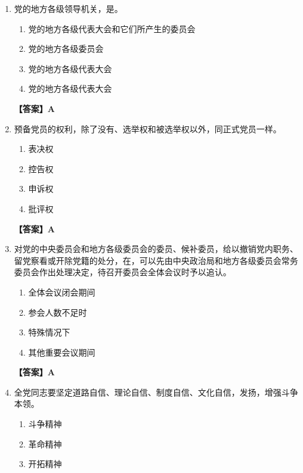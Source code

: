 \documentclass[UTF8,11pt,a4paper]{ctexart}
\begin{document}
\begin{enumerate}[label=\textbf{\arabic*.}, leftmargin=2.5em, itemsep=0.7em]
\begin{enumerate}[label=\Alph*., leftmargin=2em, itemsep=0.1em, topsep=0.15em]
\item 诚信友善
\item 守正务实
\end{enumerate}
\textbf{【答案】A}
\item 党的地方各级领导机关，是\allowbreak\underline{\hspace{4em}}。
\begin{enumerate}[label=\Alph*., leftmargin=2em, itemsep=0.1em, topsep=0.15em]
\item 党的地方各级代表大会和它们所产生的委员会
\item 党的地方各级委员会
\item 党的地方各级代表大会
\item 党的地方各级代表大会
\end{enumerate}
\textbf{【答案】A}
\item 预备党员的权利，除了没有\allowbreak\underline{\hspace{4em}}、选举权和被选举权以外，同正式党员一样。
\begin{enumerate}[label=\Alph*., leftmargin=2em, itemsep=0.1em, topsep=0.15em]
\item 表决权
\item 控告权
\item 申诉权
\item 批评权
\end{enumerate}
\textbf{【答案】A}
\item 对党的中央委员会和地方各级委员会的委员、候补委员，给以撤销党内职务、留党察看或开除党籍的处分，在\allowbreak\underline{\hspace{4em}}，可以先由中央政治局和地方各级委员会常务委员会作出处理决定，待召开委员会全体会议时予以追认。
\begin{enumerate}[label=\Alph*., leftmargin=2em, itemsep=0.1em, topsep=0.15em]
\item 全体会议闭会期间
\item 参会人数不足时
\item 特殊情况下
\item 其他重要会议期间
\end{enumerate}
\textbf{【答案】A}
\item 全党同志要坚定道路自信、理论自信、制度自信、文化自信，发扬\allowbreak\underline{\hspace{4em}}，增强斗争本领。
\begin{enumerate}[label=\Alph*., leftmargin=2em, itemsep=0.1em, topsep=0.15em]
\item 斗争精神
\item 革命精神
\item 开拓精神

\end{enumerate}
\end{enumerate}
\end{document}
